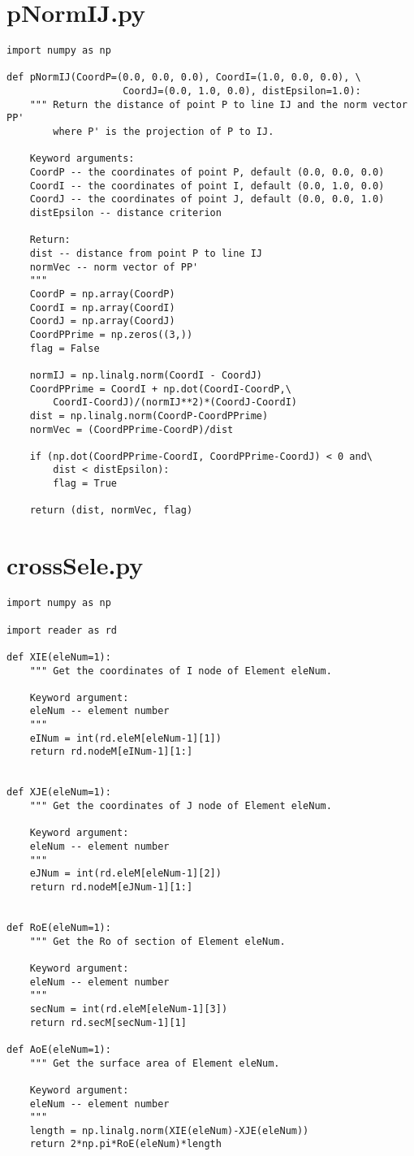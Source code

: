 \section{pNormIJ.py}
\begin{verbatim}
import numpy as np

def pNormIJ(CoordP=(0.0, 0.0, 0.0), CoordI=(1.0, 0.0, 0.0), \
                    CoordJ=(0.0, 1.0, 0.0), distEpsilon=1.0):
    """ Return the distance of point P to line IJ and the norm vector PP'
        where P' is the projection of P to IJ.

    Keyword arguments:
    CoordP -- the coordinates of point P, default (0.0, 0.0, 0.0)
    CoordI -- the coordinates of point I, default (0.0, 1.0, 0.0)
    CoordJ -- the coordinates of point J, default (0.0, 0.0, 1.0)
    distEpsilon -- distance criterion

    Return:
    dist -- distance from point P to line IJ
    normVec -- norm vector of PP'
    """
    CoordP = np.array(CoordP)
    CoordI = np.array(CoordI)
    CoordJ = np.array(CoordJ)
    CoordPPrime = np.zeros((3,))
    flag = False

    normIJ = np.linalg.norm(CoordI - CoordJ)
    CoordPPrime = CoordI + np.dot(CoordI-CoordP,\
        CoordI-CoordJ)/(normIJ**2)*(CoordJ-CoordI)
    dist = np.linalg.norm(CoordP-CoordPPrime)
    normVec = (CoordPPrime-CoordP)/dist

    if (np.dot(CoordPPrime-CoordI, CoordPPrime-CoordJ) < 0 and\
        dist < distEpsilon):
        flag = True

    return (dist, normVec, flag)
\end{verbatim}

\section{crossSele.py}  
\begin{verbatim}
import numpy as np

import reader as rd

def XIE(eleNum=1):
    """ Get the coordinates of I node of Element eleNum.

    Keyword argument:
    eleNum -- element number
    """
    eINum = int(rd.eleM[eleNum-1][1])
    return rd.nodeM[eINum-1][1:]


def XJE(eleNum=1):
    """ Get the coordinates of J node of Element eleNum.

    Keyword argument:
    eleNum -- element number
    """
    eJNum = int(rd.eleM[eleNum-1][2])
    return rd.nodeM[eJNum-1][1:]


def RoE(eleNum=1):
    """ Get the Ro of section of Element eleNum.

    Keyword argument:
    eleNum -- element number
    """
    secNum = int(rd.eleM[eleNum-1][3])
    return rd.secM[secNum-1][1]

def AoE(eleNum=1):
    """ Get the surface area of Element eleNum.

    Keyword argument:
    eleNum -- element number    
    """
    length = np.linalg.norm(XIE(eleNum)-XJE(eleNum))
    return 2*np.pi*RoE(eleNum)*length

\end{verbatim}

